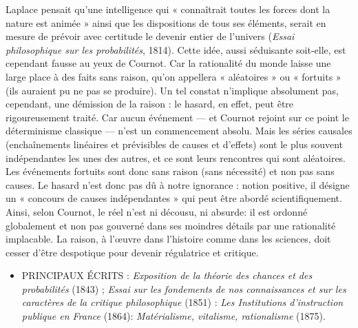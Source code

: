 Laplace pensait qu'une intelligence qui
« connaîtrait toutes les forces dont la
nature est animée » ainsi que les dispositions de tous ses éléments, serait en
mesure de prévoir avec certitude le
devenir entier de l'univers ({\it Essai philosophique sur les probabilités}, 1814).
Cette idée, aussi séduisante soit-elle, est
cependant fausse au yeux de Cournot.
Car la rationalité du monde laisse une
large place à des faits sans raison, qu’on
appellera « aléatoires » ou « fortuits » (ils
auraient pu ne pas se produire). Un tel
constat n'implique absolument pas,
cependant, une démission de la raison :
le hasard, en effet, peut être rigoureusement traité. Car aucun événement —
et Cournot rejoint sur ce point le déterminisme classique — n'est un commencement absolu. Mais les séries causales
(enchaînements linéaires et prévisibles
de causes et d'effets) sont le plus souvent indépendantes les unes des autres,
et ce sont leurs rencontres qui sont aléatoires. Les événements fortuits sont donc
sans raison (sans nécessité) et non pas
sans causes. Le hasard n'est donc pas
dû à notre ignorance : notion positive, il
désigne un « concours de causes indépendantes » qui peut être abordé scientifiquement. Ainsi, selon Cournot, le réel
n'est ni décousu, ni absurde: il est
ordonné globalement et non pas gouverné dans ses moindres détails par une
rationalité implacable. La raison, à
l'œuvre dans l’histoire comme dans les
sciences, doit cesser d’être despotique
pour devenir régulatrice et critique.

\begin{itemize}[leftmargin=1cm, label=, itemsep=1pt]
\item {\footnotesize PRINCIPAUX ÉCRITS} : {\it Exposition de
la théorie des chances et des probabilités} (1843) ; {\it Essai sur les fondements de nos connaissances et
sur les caractères de la critique philosophique} (1851) : {\it Les Institutions
d'instruction publique en France}
(1864): {\it Matérialisme,  vitalisme,
rationalisme} (1875).
\end{itemize}

